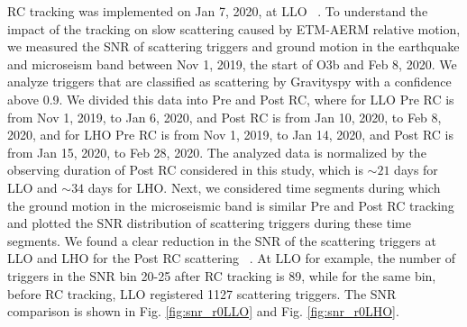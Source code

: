 \documentclass[12pt]{iopart}
\begin{document}
RC tracking was implemented on Jan 7, 2020, at LLO ~\cite{alog_anamaria}. To understand the impact of the tracking on slow scattering caused by ETM-AERM relative motion, we measured the SNR of scattering triggers and ground motion in the earthquake and microseism band between Nov 1, 2019, the start of O3b and Feb 8, 2020. We analyze triggers that are classified as scattering by Gravityspy with a confidence above 0.9. We divided this data into Pre and Post RC, where for LLO Pre RC is from Nov 1, 2019, to Jan 6, 2020, and Post RC is from Jan 10, 2020, to Feb 8, 2020, and for LHO Pre RC is from Nov 1, 2019, to Jan 14, 2020, and Post RC is from Jan 15, 2020, to Feb 28, 2020. The analyzed data is normalized by the observing duration of Post RC considered in this study, which is $\sim 21$ days for LLO and $\sim 34$ days for LHO. Next, we considered time segments during which the ground motion in the microseismic band is similar Pre and Post RC tracking and plotted the SNR distribution of scattering triggers during these time segments. We found a clear reduction in the SNR of the scattering triggers at LLO and LHO for the Post RC scattering ~\cite{alogsid_R0}. At LLO for example, the number of triggers in the SNR bin 20-25 after RC tracking is 89, while for the same bin, before RC tracking, LLO registered 1127 scattering triggers. The SNR comparison is shown in Fig. \ref{fig:snr_r0LLO}  and Fig. \ref{fig:snr_r0LHO}.
\end{document}
